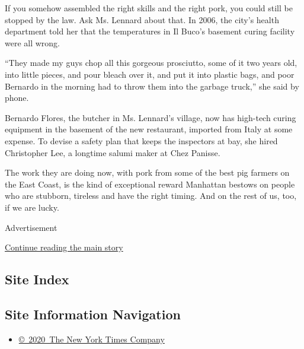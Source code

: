 If you somehow assembled the right skills and the right pork, you could
still be stopped by the law. Ask Ms. Lennard about that. In 2006, the
city's health department told her that the temperatures in Il Buco's
basement curing facility were all wrong.

``They made my guys chop all this gorgeous prosciutto, some of it two
years old, into little pieces, and pour bleach over it, and put it into
plastic bags, and poor Bernardo in the morning had to throw them into
the garbage truck,'' she said by phone.

Bernardo Flores, the butcher in Ms. Lennard's village, now has high-tech
curing equipment in the basement of the new restaurant, imported from
Italy at some expense. To devise a safety plan that keeps the inspectors
at bay, she hired Christopher Lee, a longtime salumi maker at Chez
Panisse.

The work they are doing now, with pork from some of the best pig farmers
on the East Coast, is the kind of exceptional reward Manhattan bestows
on people who are stubborn, tireless and have the right timing. And on
the rest of us, too, if we are lucky.

Advertisement

\protect\hyperlink{after-bottom}{Continue reading the main story}

\hypertarget{site-index}{%
\subsection{Site Index}\label{site-index}}

\hypertarget{site-information-navigation}{%
\subsection{Site Information
Navigation}\label{site-information-navigation}}

\begin{itemize}
\tightlist
\item
  \href{https://help.nytimes3xbfgragh.onion/hc/en-us/articles/115014792127-Copyright-notice}{©~2020~The
  New York Times Company}
\end{itemize}

